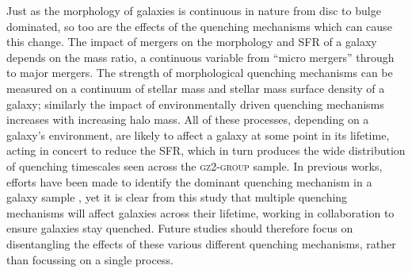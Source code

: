 \documentclass[useAMS,usenatbib]{mn2e}
\begin{document}

Just as the morphology of galaxies is continuous in nature from disc to bulge dominated, so too are the effects of the quenching mechanisms which can cause this change. The impact of mergers on the morphology and SFR of a galaxy depends on the mass ratio, a continuous variable from ``micro mergers'' \citep{carlin16} through to major mergers. The strength of morphological quenching mechanisms can be measured on a continuum of stellar mass and stellar mass surface density of a galaxy; similarly the impact of environmentally driven quenching mechanisms increases with increasing halo mass. All of these processes, depending on a galaxy's environment, are likely to affect a galaxy at some point in its lifetime, acting in concert to reduce the SFR, which in turn produces the wide distribution of quenching timescales seen across the \textsc{gz2-group} sample. In previous works, efforts have been made to identify the dominant quenching mechanism in a galaxy sample \citep[e.g.][]{muzzin12, schawinski14, foltz15, woo15, balogh16, darvish16, huertascompany16}, yet it is clear from this study that multiple quenching mechanisms will affect galaxies across their lifetime, working in collaboration to ensure galaxies stay quenched. Future studies should therefore focus on disentangling the effects of these various different quenching mechanisms, rather than focussing on a single process. 
\end{document}
